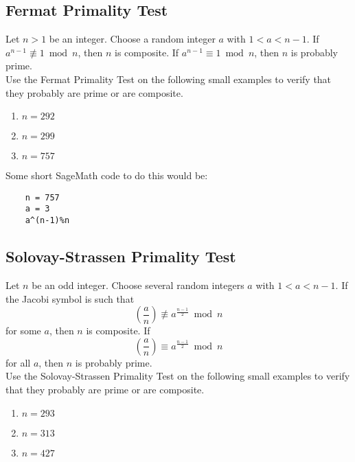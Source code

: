 \documentclass[12pt]{amsart}
\theoremstyle{plain}
\theoremstyle{definition}
\theoremstyle{remark}
\begin{document}
\subsection{Fermat Primality Test} Let $n > 1$ be an integer.  Choose a random integer $a$ with $1 < a < n-1$.  If $a^{n-1} \not\equiv 1 \bmod n$, then $n$ is composite.  If $a^{n-1} \equiv 1 \bmod n$, then $n$ is probably prime.\\

\noindent Use the Fermat Primality Test on the following small examples to verify that they probably are prime or are composite.
\begin{enumerate}[1.]
	\item $n = 292$\\ \vspace{.2in}
	\item $n = 299$\\ \vspace{.2in}
	\item $n = 757$\\ \vspace{.2in}
\end{enumerate}
Some short SageMath code to do this would be:
\begin{lstlisting}
	n = 757
	a = 3
	a^(n-1)%n
\end{lstlisting}

\subsection{Solovay-Strassen Primality Test} Let $n$ be an odd integer.  Choose several random integers $a$ with $1 < a < n-1$.  If the Jacobi symbol is such that $$\left( \frac{a}{n} \right) \not\equiv a^{\frac{n-1}{2}} \bmod n$$
for some $a$, then $n$ is composite.  If 
$$\left( \frac{a}{n} \right)  \equiv a^{\frac{n-1}{2}} \bmod n$$
for all $a$, then $n$ is probably prime.\\

\noindent Use the Solovay-Strassen Primality Test on the following small examples to verify that they probably are prime or are composite.
\begin{enumerate}[1.]
	\item $n = 293$\\ \vspace{.2in}
	\item $n = 313$\\ \vspace{.2in}
	\item $n = 427$\\ \vspace{.2in}
\end{enumerate}
\end{document}
